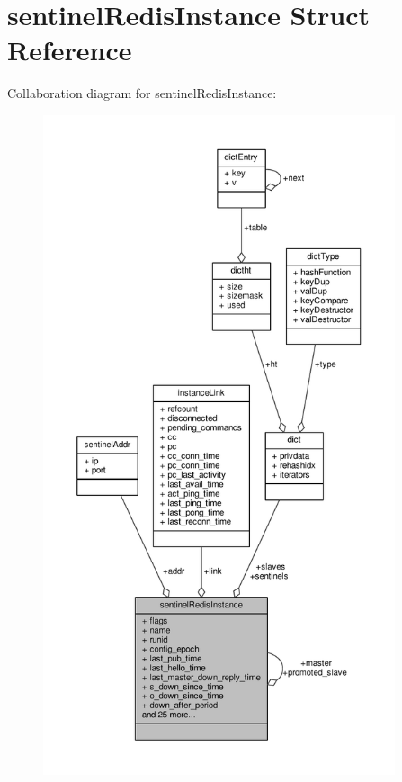 \hypertarget{structsentinelRedisInstance}{}\section{sentinel\+Redis\+Instance Struct Reference}
\label{structsentinelRedisInstance}


Collaboration diagram for sentinel\+Redis\+Instance\+:\nopagebreak
\begin{figure}[H]
\begin{center}
\leavevmode
\includegraphics[height=550pt]{structsentinelRedisInstance__coll__graph}
\end{center}
\end{figure}
